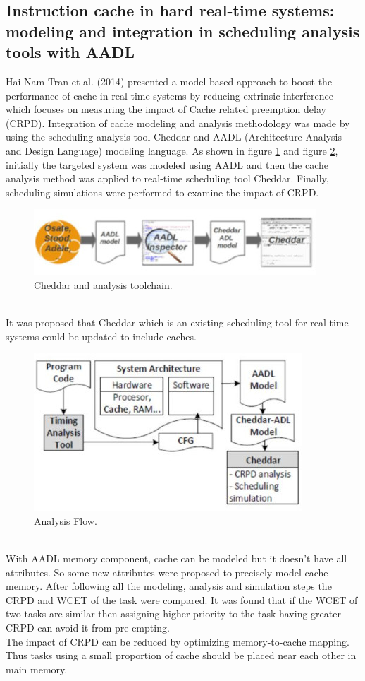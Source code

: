 \documentclass[conference]{IEEEtran}
\begin{document}
\subsection{\textbf{Instruction cache in hard real-time systems: modeling and integration in scheduling analysis tools with AADL}\cite{b5}}
    Hai Nam Tran et al. (2014)\cite{b5} presented a model-based approach to boost the performance of cache in real time systems by reducing extrinsic interference which focuses on measuring the impact of Cache related preemption delay (CRPD). Integration of cache modeling and analysis methodology was made by using the scheduling analysis tool Cheddar and AADL (Architecture Analysis and Design Language) modeling language.
    As shown in figure \ref{fig_e_1} and figure \ref{fig_e_2}, initially the targeted system was modeled using AADL and then the cache analysis method was applied to real-time scheduling tool Cheddar. Finally, scheduling simulations were performed to examine the impact of CRPD.\\
    \begin{figure}[htbp]
        \centerline{\includegraphics{Cheddar and analysis toolchain .JPG}}
        \caption{Cheddar and analysis toolchain.\cite{b5}}
        \label{fig_e_1}
    \end{figure}\\
    It was proposed that Cheddar which is an existing scheduling tool for real-time systems could be updated to include caches.\\
    \begin{figure}[htbp]
        \centerline{\includegraphics{Analysis Flow .JPG}}
        \caption{Analysis Flow.\cite{b5}}
        \label{fig_e_2}
    \end{figure}\\
    With AADL memory component, cache can be modeled but it doesn’t have all attributes. So some new attributes were proposed to precisely model cache memory. After following all the modeling, analysis and simulation steps the CRPD and WCET of the task were compared. It was found that if the WCET of two tasks are similar then assigning higher priority to the task having greater CRPD can avoid it from pre-empting.\\
    The impact of CRPD can be reduced by optimizing memory-to-cache mapping. Thus tasks using a small proportion of cache should be placed near each other in main memory.
\end{document}
